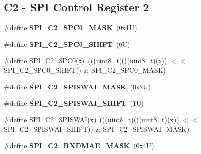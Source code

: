 \subsection*{C2 -\/ S\+PI Control Register 2}
\begin{DoxyCompactItemize}
\item 
\mbox{\label{group___s_p_i___register___masks_gaaaeac694d1d42228524e96040a9ddf53}} 
\#define {\bfseries S\+P\+I\+\_\+\+C2\+\_\+\+S\+P\+C0\+\_\+\+M\+A\+SK}~(0x1\+U)
\item 
\mbox{\label{group___s_p_i___register___masks_gabd2530719a946cda56c285547a8239ee}} 
\#define {\bfseries S\+P\+I\+\_\+\+C2\+\_\+\+S\+P\+C0\+\_\+\+S\+H\+I\+FT}~(0\+U)
\item 
\#define \mbox{\hyperlink{group___s_p_i___register___masks_gab16a1d13668a17afd3e58744bb8bdfde}{S\+P\+I\+\_\+\+C2\+\_\+\+S\+P\+C0}}(x)~(((uint8\+\_\+t)(((uint8\+\_\+t)(x)) $<$$<$ S\+P\+I\+\_\+\+C2\+\_\+\+S\+P\+C0\+\_\+\+S\+H\+I\+FT)) \& S\+P\+I\+\_\+\+C2\+\_\+\+S\+P\+C0\+\_\+\+M\+A\+SK)
\item 
\mbox{\label{group___s_p_i___register___masks_ga05643847feabba49c1e7e16044278d08}} 
\#define {\bfseries S\+P\+I\+\_\+\+C2\+\_\+\+S\+P\+I\+S\+W\+A\+I\+\_\+\+M\+A\+SK}~(0x2\+U)
\item 
\mbox{\label{group___s_p_i___register___masks_gae756e76f39bea0b21aac347ba75fd16c}} 
\#define {\bfseries S\+P\+I\+\_\+\+C2\+\_\+\+S\+P\+I\+S\+W\+A\+I\+\_\+\+S\+H\+I\+FT}~(1\+U)
\item 
\#define \mbox{\hyperlink{group___s_p_i___register___masks_ga2e705fe1281340e173615635d0497e9d}{S\+P\+I\+\_\+\+C2\+\_\+\+S\+P\+I\+S\+W\+AI}}(x)~(((uint8\+\_\+t)(((uint8\+\_\+t)(x)) $<$$<$ S\+P\+I\+\_\+\+C2\+\_\+\+S\+P\+I\+S\+W\+A\+I\+\_\+\+S\+H\+I\+FT)) \& S\+P\+I\+\_\+\+C2\+\_\+\+S\+P\+I\+S\+W\+A\+I\+\_\+\+M\+A\+SK)
\item 
\mbox{\label{group___s_p_i___register___masks_gab50dca40cbee0b9359dd2f27fa0920da}} 
\#define {\bfseries S\+P\+I\+\_\+\+C2\+\_\+\+R\+X\+D\+M\+A\+E\+\_\+\+M\+A\+SK}~(0x4\+U)
\item 
\mbox{\label{group___s_p_i___register___masks_ga5460ff43cfcee3211e76bb6ef2321563}} 

\end{DoxyCompactItemize}
